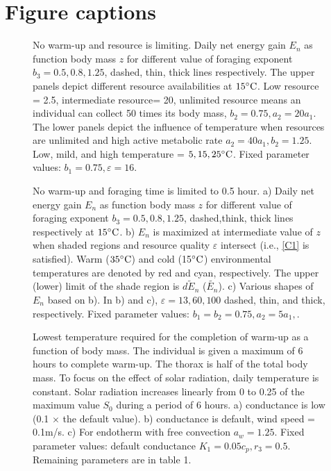 \section*{Figure captions}
\begin{figure}[H]
\begin{center}
\caption{
	No warm-up and resource is limiting.
	Daily net energy gain  $E_n$ as function body mass $z$ for different value of foraging exponent $b_3 = 0.5, 0.8, 1.25$, dashed, thin, thick lines respectively.
	The upper panels depict different resource availabilities at $15 ^{\circ} \rm{C}$. 
	Low resource = 2.5, intermediate resource= 20, unlimited resource means an individual can collect 50 times its body mass, $b_2 = 0.75, a_2 = 20 a_1$. 
	The lower panels depict the influence of temperature when resources are unlimited and high active metabolic rate $a_2 = 40 a_1, b_2  = 1.25$.
	Low, mild, and high temperature = $5, 15, 25^{\circ} \rm{C}$.
	Fixed parameter values: $b_1 = 0.75, \varepsilon = 16$.
}
\label{fig1}
\end{center}
\end{figure}
\vspace{-1.5cm}
%
\begin{figure}[H]
\begin{center}
\caption{
	No warm-up and foraging time is limited to 0.5 hour.
	a) Daily net energy gain  $E_n$ as function body mass $z$ for different value of foraging exponent $b_3 = 0.5, 0.8, 1.25$, dashed,think, thick lines respectively  at $15 ^{\circ} \rm{C}$.
	b) $E_n$ is maximized at intermediate value of $z$  when shaded regions and resource quality $\varepsilon$ intersect (i.e., \cref{C1} is satisfied).
	Warm ($35^{\circ} \rm{C}$) and cold (15$^{\circ} \rm{C}$) environmental temperatures are denoted by red and cyan, respectively.
	The upper (lower) limit of the shade region is $\widetilde{dE_n}$ ($\widetilde{E_n}$).  
	c) Various shapes of $E_n$ based on b).
	In b) and c), $\varepsilon = 13, 60, 100$ dashed, thin, and thick, respectively.
	Fixed parameter values: $b_1 = b_2 = 0.75, a_2 = 5 a_1, $.
}
\label{fig2}
\end{center}
\end{figure}
\vspace{-1.5cm}
%
\begin{figure}[H]
\begin{center}
\caption{
	Lowest temperature required for the completion of warm-up as a function of body mass.
	The individual is given a maximum of 6 hours to complete warm-up.
	The thorax is half of the total body mass.
	To focus on the effect of solar radiation, daily temperature is constant.
	Solar radiation increases linearly from 0 to 0.25 of the maximum value $S_0$ during a period of 6 hours. 
	a) conductance is low (0.1 $\times$ the default value).
	b) conductance is default, wind speed  = 0.1m/s.
	c) For endotherm with free convection $a_w = 1.25$. 
	Fixed parameter values: default conductance $K_1 = 0.05 c_p, r_3 = 0.5$.
	Remaining parameters are in table 1.
}%
\label{fig3}
\end{center}
\end{figure}
